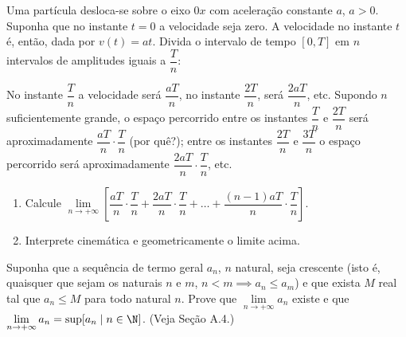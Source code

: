 \begin{exercicio}[7]
Uma partícula desloca-se sobre o eixo $0x$ com aceleração constante $a$, $a > 0$. Suponha que no instante $t = 0$ a velocidade seja zero. A velocidade no instante $t$ é, então, dada por $v(t) = at$. Divida o intervalo de tempo $[0, T]$ em $n$ intervalos de amplitudes iguais a $\dfrac{T}{n}$:

\begin{center}
\end{center}

No instante $\dfrac{T}{n}$ a velocidade será $\dfrac{aT}{n}$, no instante $\dfrac{2T}{n}$, será $\dfrac{2aT}{n}$, etc. Supondo $n$ suficientemente grande, o espaço percorrido entre os instantes $\dfrac{T}{n}$ e $\dfrac{2T}{n}$ será aproximadamente $\dfrac{aT}{n}\cdot\dfrac{T}{n}$ (por quê?); entre os instantes $\dfrac{2T}{n}$ e $\dfrac{3T}{n}$ o espaço percorrido será aproximadamente $\dfrac{2aT}{n}\cdot\dfrac{T}{n}$, etc.
\begin{enumerate}[label=\alph*)]
    \item Calcule $\lim\limits_{n \to +\infty} \left[\dfrac{aT}{n}\cdot\dfrac{T}{n} + \dfrac{2aT}{n}\cdot\dfrac{T}{n} + \dots + \dfrac{(n - 1)aT}{n}\cdot\dfrac{T}{n}\right]$.
    \item Interprete cinemática e geometricamente o limite acima.
\end{enumerate}
\end{exercicio}

\begin{exercicio}[8]
Suponha que a sequência de termo geral $a_n$, $n$ natural, seja crescente (isto é, quaisquer que sejam os naturais $n$ e $m$, $n < m \implies a_n \le a_m$) e que exista $M$ real tal que $a_n \le M$ para todo natural $n$. Prove que $\lim\limits_{n \to +\infty} a_n$ existe e que $\lim\limits_{n \to +\infty} a_n = \sup[a_n \mid n \in \N]$. (Veja Seção A.4.)
\end{exercicio}

